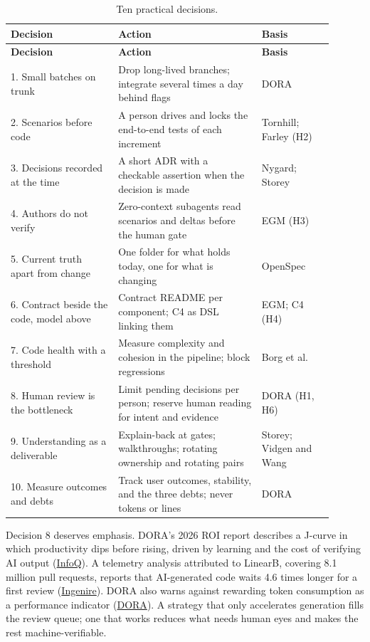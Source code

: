 \documentclass[11pt]{article}
\begin{document}
\small
\begin{longtable}{p{0.3\linewidth}p{0.4\linewidth}p{0.2\linewidth}}
\caption{Ten practical decisions.}\\
\toprule
\textbf{Decision} & \textbf{Action} & \textbf{Basis} \\
\midrule
\endfirsthead
\toprule
\textbf{Decision} & \textbf{Action} & \textbf{Basis} \\
\midrule
\endhead
1. Small batches on trunk & Drop long-lived branches; integrate several times a day behind flags & DORA \\
2. Scenarios before code & A person drives and locks the end-to-end tests of each increment & Tornhill; Farley (H2) \\
3. Decisions recorded at the time & A short ADR with a checkable assertion when the decision is made & Nygard; Storey \\
4. Authors do not verify & Zero-context subagents read scenarios and deltas before the human gate & EGM (H3) \\
5. Current truth apart from change & One folder for what holds today, one for what is changing & OpenSpec \\
6. Contract beside the code, model above & Contract README per component; C4 as DSL linking them & EGM; C4 (H4) \\
7. Code health with a threshold & Measure complexity and cohesion in the pipeline; block regressions & Borg et al. \\
8. Human review is the bottleneck & Limit pending decisions per person; reserve human reading for intent and evidence & DORA (H1, H6) \\
9. Understanding as a deliverable & Explain-back at gates; walkthroughs; rotating ownership and rotating pairs & Storey; Vidgen and Wang \\
10. Measure outcomes and debts & Track user outcomes, stability, and the three debts; never tokens or lines & DORA \\
\bottomrule
\end{longtable}
\normalsize

Decision 8 deserves emphasis. DORA's 2026 ROI report describes a J-curve in which productivity dips before rising, driven by learning and the cost of verifying AI output (\href{https://www.infoq.com/news/2026/05/dora-roi-ai-assisted-dev-report/}{InfoQ}). A telemetry analysis attributed to LinearB, covering 8.1 million pull requests, reports that AI-generated code waits 4.6 times longer for a first review (\href{https://ingenire.com/blog/dora-2026-ai-amplifier}{Ingenire}). DORA also warns against rewarding token consumption as a performance indicator (\href{https://dora.dev/insights/}{DORA}). A strategy that only accelerates generation fills the review queue; one that works reduces what needs human eyes and makes the rest machine-verifiable.
\end{document}
